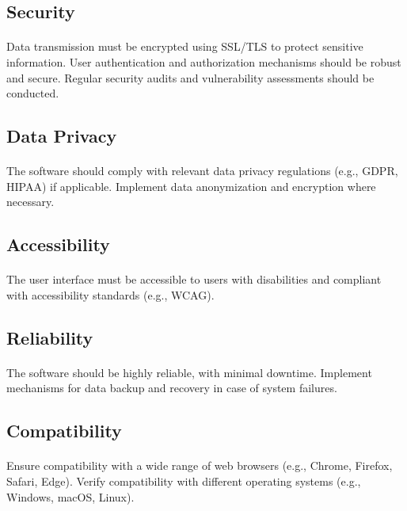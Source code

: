 \documentclass{article}
\begin{document}
\subsection{Security}
\paragraph{}
Data transmission must be encrypted using SSL/TLS to protect sensitive information.
User authentication and authorization mechanisms should be robust and secure.
Regular security audits and vulnerability assessments should be conducted.

\subsection{Data Privacy}
\paragraph{}
The software should comply with relevant data privacy regulations (e.g., GDPR, HIPAA) if applicable.
Implement data anonymization and encryption where necessary.

\subsection{Accessibility}
\paragraph{}
The user interface must be accessible to users with disabilities and compliant with accessibility standards (e.g., WCAG).

\subsection{Reliability}
\paragraph{}
The software should be highly reliable, with minimal downtime.
Implement mechanisms for data backup and recovery in case of system failures.

\subsection{Compatibility}
\paragraph{}
Ensure compatibility with a wide range of web browsers (e.g., Chrome, Firefox, Safari, Edge).
Verify compatibility with different operating systems (e.g., Windows, macOS, Linux).
\end{document}
